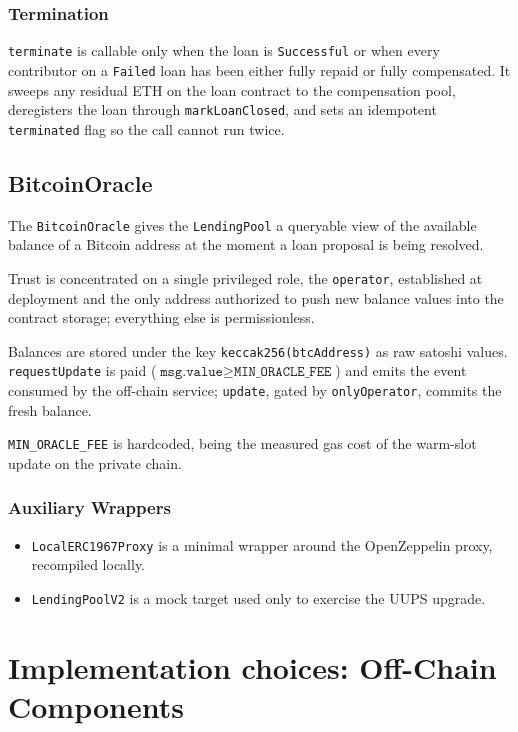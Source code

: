 \documentclass{report}
\begin{document}
\subsubsection*{Termination}
\texttt{terminate} is callable only when the loan is \texttt{Successful} or when every contributor on a \texttt{Failed} loan has been either fully repaid or fully compensated. It sweeps any residual ETH on the loan contract to the compensation pool, deregisters the loan through \texttt{markLoanClosed}, and sets an idempotent \texttt{terminated} flag so the call cannot run twice.

\subsection*{BitcoinOracle}
The \texttt{BitcoinOracle} gives the \texttt{LendingPool} a queryable view of the available balance of a Bitcoin address at the moment a loan proposal is being resolved.

Trust is concentrated on a single privileged role, the \texttt{operator}, established at deployment and the only address authorized to push new balance values into the contract storage; everything else is permissionless.

Balances are stored under the key \texttt{keccak256(btcAddress)} as raw satoshi values. \texttt{requestUpdate} is paid ($\texttt{msg.value} \ge \texttt{MIN\_ORACLE\_FEE}$) and emits the event consumed by the off-chain service; \texttt{update}, gated by \texttt{onlyOperator}, commits the fresh balance. 

\texttt{MIN\_ORACLE\_FEE} is hardcoded, being the measured gas cost of the warm-slot update on the private chain.

\subsubsection*{Auxiliary Wrappers}
\begin{itemize}
    \item \texttt{LocalERC1967Proxy} is a minimal wrapper around the OpenZeppelin proxy, recompiled locally.
    \item \texttt{LendingPoolV2} is a mock target used only to exercise the UUPS upgrade.
\end{itemize}

\section*{Implementation choices: Off-Chain Components}
\end{document}
